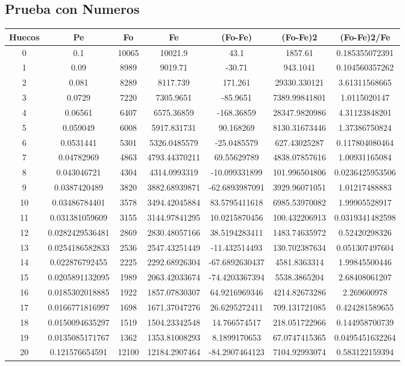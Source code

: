\documentclass{article}
\begin{document}
\subsection{Prueba con Numeros}
\begin{tabular}{|c|c|c|c|c|c|c|}
Huecos&Pe&Fo&Fe&(Fo{-}Fe)&(Fo{-}Fe)2&(Fo{-}Fe)2/Fe\\
\hline
0&0.1&10065&10021.9&43.1&1857.61&0.185355072391\\
\hline
1&0.09&8989&9019.71&{-}30.71&943.1041&0.104560357262\\
\hline
2&0.081&8289&8117.739&171.261&29330.330121&3.61311568665\\
\hline
3&0.0729&7220&7305.9651&{-}85.9651&7389.99841801&1.0115020147\\
\hline
4&0.06561&6407&6575.36859&{-}168.36859&28347.9820986&4.31123848201\\
\hline
5&0.059049&6008&5917.831731&90.168269&8130.31673446&1.37386750824\\
\hline
6&0.0531441&5301&5326.0485579&{-}25.0485579&627.43025287&0.117804080464\\
\hline
7&0.04782969&4863&4793.44370211&69.55629789&4838.07857616&1.00931165084\\
\hline
8&0.043046721&4304&4314.0993319&{-}10.099331899&101.996504806&0.0236425953506\\
\hline
9&0.0387420489&3820&3882.68939871&{-}62.6893987091&3929.96071051&1.01217488883\\
\hline
10&0.03486784401&3578&3494.42045884&83.5795411618&6985.53970082&1.99905528917\\
\hline
11&0.031381059609&3155&3144.97841295&10.0215870456&100.432206913&0.0319341482598\\
\hline
12&0.0282429536481&2869&2830.48057166&38.5194283411&1483.74635972&0.52420298326\\
\hline
13&0.0254186582833&2536&2547.43251449&{-}11.432514493&130.702387634&0.051307497604\\
\hline
14&0.022876792455&2225&2292.68926304&{-}67.6892630437&4581.8363314&1.99845500446\\
\hline
15&0.0205891132095&1989&2063.42033674&{-}74.4203367394&5538.3865204&2.68408061207\\
\hline
16&0.0185302018885&1922&1857.07830307&64.9216969346&4214.82673286&2.269600978\\
\hline
17&0.0166771816997&1698&1671.37047276&26.6295272411&709.131721085&0.424281589655\\
\hline
18&0.0150094635297&1519&1504.23342548&14.766574517&218.051722966&0.144958700739\\
\hline
19&0.0135085171767&1362&1353.81008293&8.1899170653&67.0747415365&0.0495451632264\\
\hline
20&0.121576654591&12100&12184.2907464&{-}84.2907464123&7104.92993074&0.583122159394\\
\end{tabular}
\end{document}
